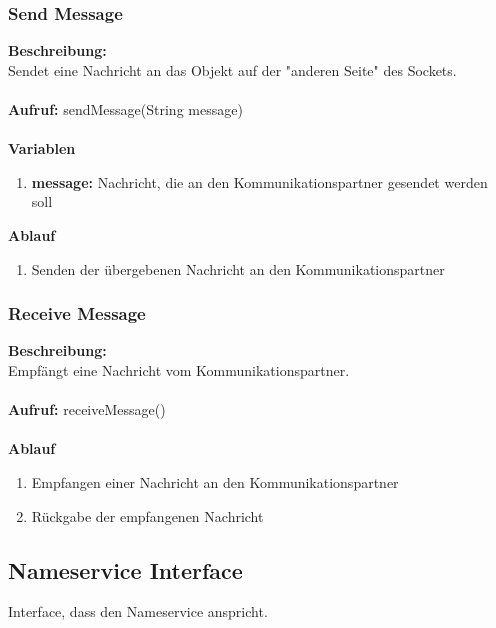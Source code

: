 \subsubsection{Send Message}
\textbf{Beschreibung:}\\
Sendet eine Nachricht an das Objekt auf der "anderen Seite" des Sockets.\\ \\
\textbf{Aufruf:} sendMessage(String message)\\ \\
\textbf{Variablen}
\begin{enumerate}
\item \textbf{message:} Nachricht, die an den Kommunikationspartner gesendet werden soll
\end{enumerate}
\textbf{Ablauf}
\begin{enumerate}
\item Senden der übergebenen Nachricht an den Kommunikationspartner
\end{enumerate}

\subsubsection{Receive Message}
\textbf{Beschreibung:}\\
Empfängt eine Nachricht vom Kommunikationspartner.\\ \\
\textbf{Aufruf:} receiveMessage()\\ \\
\textbf{Ablauf}
\begin{enumerate}
\item Empfangen einer Nachricht an den Kommunikationspartner
\item Rückgabe der empfangenen Nachricht
\end{enumerate}

\subsection{Nameservice Interface}
Interface, dass den Nameservice anspricht.

